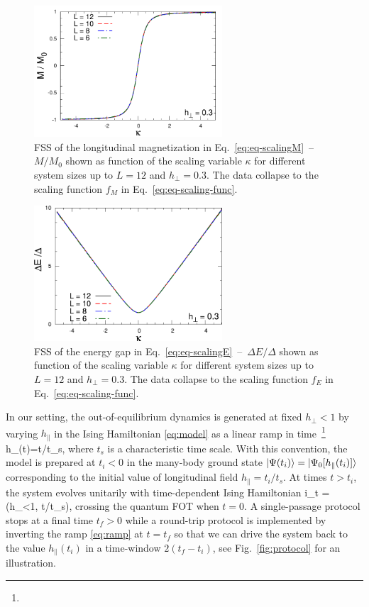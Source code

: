 \begin{figure}[t]
\centering
\includegraphics[width=7cm]{imm/magn.pdf}\\
\caption{FSS of the longitudinal magnetization in Eq.~\eqref{eq:eq-scalingM}~--~$M/M_0$ shown as function of the scaling variable $\kappa$ for different system sizes up to $L=12$ and $h_\perp=0.3$. The data collapse to the scaling function $f_M$ in Eq.~\eqref{eq:eq-scaling-func}.}\label{fig:eq-FSS-M}
\includegraphics[width=7cm]{imm/gap-2.pdf}
\caption{FSS of the energy gap in Eq.~\eqref{eq:eq-scalingE}~--~$\Delta E/\Delta$ shown as function of the scaling variable $\kappa$ for different system sizes up to $L=12$ and $h_\perp=0.3$. The data collapse to the scaling function $f_E$ in Eq.~\eqref{eq:eq-scaling-func}.}\label{fig:eq-FSS-E}
\end{figure}

In our setting, the out-of-equilibrium dynamics is generated at fixed $h_\perp<1$ by varying $h_\parallel$ in the Ising Hamiltonian \eqref{eq:model} as a linear ramp in time~\footnote{}
\be\label{eq:ramp}
h_\parallel(t)=t/t_s,
\ee
where $t_s$ is a characteristic time scale. With this convention, the model is prepared at $t_i<0$ in the many-body ground state $\ket{\Psi(t_i)}=\ket{\Psi_0[h_\parallel(t_i)]}$ corresponding to the initial value of longitudinal field $h_\parallel=t_i/t_s$. At times $t>t_i$, the system evolves unitarily with time-dependent Ising Hamiltonian 
\be\label{eq:schrodinger}
i\de_t = (h_\perp<1, t/t_s),
\ee
crossing the quantum FOT when $t=0$. A single-passage protocol stops at a final time $t_f>0$ while a round-trip protocol is implemented by inverting the ramp \eqref{eq:ramp} at $t=t_f$ so that we can drive the system back to the value $h_\parallel(t_i)$ in a time-window $2(t_f-t_i)$, see Fig.~\ref{fig:protocol} for an illustration.\\



